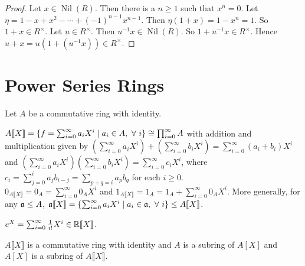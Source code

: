 \begin{proof}
    Let $x \in \operatorname{Nil}(R)$. Then there is a $n \geq 1$ such that $x^n = 0$. Let $\eta = 1-x+x^2-\cdots+(-1)^{n-1}x^{n-1}$. Then $\eta(1+x) = 1-x^n = 1$. So $1+x \in R^\times$. Let $u \in R^\times$. Then $u^{-1}x \in \operatorname{Nil}(R)$. So $1+u^{-1}x \in R^\times$. Hence $u + x = u(1+(u^{-1}x)) \in R^\times$. 
\end{proof}

\section*{Power Series Rings}

Let $A$ be a commutative ring with identity.

\begin{definition}
    $A \llbracket X \rrbracket = \{f = \sum_{i=0}^\infty a_iX^i \mid a_i \in A, \ \forall \  i\} \cong \prod_{i=0}^\infty A$ with addition and multiplication given by $(\sum_{i=0}^\infty a_iX^i) + (\sum_{i=0}^\infty b_iX^i) = \sum_{i=0}^\infty (a_i+b_i)X^i$ and $(\sum_{i=0}^\infty a_iX^i)(\sum_{i=0}^\infty b_iX^i) = \sum_{i=0}^\infty c_iX^i$, where $c_i = \sum_{j=0}^i a_jb_{i-j} = \sum_{p+q = i}a_pb_q$ for each $i \geq 0$. \\
    $0_{A\llbracket X \rrbracket} = 0_A = \sum_{i=0}^\infty 0_AX^i$ and $1_{A\llbracket X \rrbracket} = 1_A = 1_A + \sum_{i=0}^\infty 0_A X^i$. More generally, for any $\mathfrak{a} \leq A$, $\mathfrak{a}\llbracket X \rrbracket = \{\sum_{i=0}^\infty a_iX^i \mid a_i \in \mathfrak{a}, \ \forall \  i\} \leq A \llbracket X \rrbracket$.
\end{definition}

\begin{example}
    $e^X = \sum_{i=0}^\infty \frac{1}{i!} X^i \in \mathbb{R} \llbracket X \rrbracket$.
\end{example}

\begin{theorem}
    $A\llbracket X \rrbracket$ is a commutative ring with identity and $A$ is a subring of $A[X]$ and $A[X]$ is a subring of $A\llbracket X \rrbracket$. 
\end{theorem}

